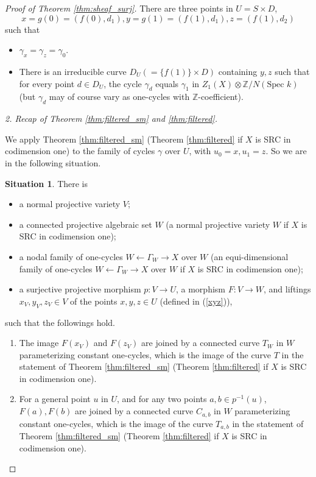 \documentclass{amsart}
\theoremstyle{definition}
\newtheorem{sit}[theorem]{Situation}
\theoremstyle{remark}
\newcommand{\mbb}{\mathbb}
\newcommand{\ZZ}{\mbb{Z}}
\newcommand{\SP}{\text{Spec }}
\begin{document}
\begin{proof}[Proof of Theorem \ref{thm:sheaf_surj}]
There are three points in $U=S \times D$, 
\begin{equation}\label{xyz}
    x=g(0)=(f(0), d_1), y=g(1)=(f(1), d_1), z=(f(1), d_2)
\end{equation}
such that
\begin{itemize}
   \item $\gamma_x=\gamma_z=\gamma_0$.
    \item There is an irreducible curve $D_U(=\{f(1)\}\times D)$ containing $y, z$ such that for every point $d \in D_U$, the cycle $\gamma_d$ equals $\gamma_1$ in $Z_1(X) \otimes \ZZ/N (\SP k)$ (but $\gamma_d$ may of course vary as one-cycles with $\ZZ$-coefficient). 
\end{itemize}


\textit{2. Recap of Theorem \ref{thm:filtered_sm} and \ref{thm:filtered}.}

We apply Theorem \ref{thm:filtered_sm} (Theorem \ref{thm:filtered} if $X$ is SRC in codimension one) to the family of cycles $\gamma$ over $U$, with $u_0=x, u_1=z$.
So we are in the following situation.
\begin{sit}\label{situ}
There is
    \begin{itemize}
    \item a normal projective variety $V$;
    \item a connected projective algebraic set $W$ (a normal projective variety $W$ if $X$ is SRC in codimension one);
    \item a nodal family of one-cycles $W\leftarrow \Gamma_W \to X$ over $W$ (an equi-dimensional family of one-cycles $W\leftarrow \Gamma_W \to X$ over $W$ if $X$ is SRC in codimension one);
    \item a surjective projective morphism $p: V \to  U$, a morphism $F: V \to W$, and liftings $x_V, y_V, z_V \in V$ of the points $x, y, z \in U$ (defined in (\ref{xyz})),
\end{itemize} 
such that the followings hold.
\begin{enumerate}
    \item[(i)]  The image $F(x_V)$ and $F(z_V)$ are joined by a connected curve $T_W$ in $W$ parameterizing constant one-cycles, which is the image of the curve $T$ in the statement of Theorem \ref{thm:filtered_sm} (Theorem \ref{thm:filtered} if $X$ is SRC in codimension one).
    
    \item[(ii)]  For a general point $u$ in $U$, and for any two points  $a, b \in p^{-1}(u)$, $F(a), F(b)$ are joined by a connected curve $C_{a, b}$ in $W$ parameterizing constant one-cycles,  which is the image of the curve $T_{a, b}$ in the statement of Theorem \ref{thm:filtered_sm} (Theorem \ref{thm:filtered} if $X$ is SRC in codimension one).


\end{enumerate}
\end{sit}
\end{proof}
\end{document}

